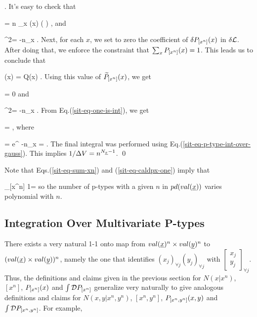 \beq
\delta {}
\;.
\eeq
It's easy to check that

\beq
\delta \call=
n \sum_x \delta {}(x)\ln
\left(
\right)
\;,
\eeq
and

\beq
\delta^2\call=
-n\sum_x
\;.
\eeq
Next, for each $x$,
we set to zero
the coefficient
of
$\delta {P_{[x^n]} }(x)$
in $\delta {\cal L}$.
After doing that, we
enforce the constraint
that $\sum_x {P_{[x^n]} }(x)=1$.
This leads us to conclude that


\beq
{}(x) = Q(x)
\;.
\eeq
Using this value of
${\widetilde{P}_{[x^n]} }(x)$,
we get

\beq
\tcall = 0
\;
\eeq
and

\beq
\delta^2\tcall=
-n\sum_x
\;.
\eeq
From Eq.(\ref{sit-eq-one-is-int}),
we get

=\Gamma
\;,
\eeq
where

\beq
\Gamma =\int \cald {}
e^{
-n\sum_x
}
=
\;.
\eeq
The final integral was performed
using Eq.(\ref{sit-eq-p-type-int-over-gauss}).
This implies $1/\Delta V= n^{N_\rvx-1}$.
\qed

Note that Eqs.(\ref{sit-eq-sum-xn})
and (\ref{sit-eq-caldpx-one}) imply that

\beq
\sum_{[x^n]}
1=
\;
\eeq
so the number
of p-types
with a given $n$
in $pd(val(\rvx))$
varies polynomial with $n$.


\subsection{Integration Over Multivariate P-types}

There exists
a very natural 1-1 onto map from
$val(\rvx)^n\times val(\rvy)^n$
to $(val(\rvx)\times val(\rvy))^n$,
namely the one that
identifies $(x_j)_{\forall j}(y_j)_{\forall j}$
with $\left[\begin{array}{c}x_j\\y_j
\end{array}\right]_{\forall j}$. Thus,
the definitions
and claims given in the previous
section for $N(x|x^n)$, $[x^n]$,
${P_{[x^n]} }(x)$ and
$\int {\cal D} {P_{[x^n]} }$
generalize very naturally to
give analogous definitions and claims
for
$N(x,y|x^n, y^n)$, $[x^n, y^n]$,
${P_{[x^n,y^n]} }(x,y)$ and
$\int {\cal D} {P_{[x^n,y^n]} }$.
For example,


